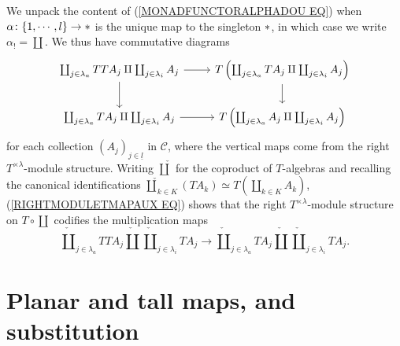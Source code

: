 \documentclass[a4paper,10pt]{article}%
\begin{document}
\begin{remark}\label{PRECOMPPOSTCOMP REM}
We unpack the content of (\ref{MONADFUNCTORALPHADOU EQ}) when 
$\alpha \colon \{1,\cdots,l\} \to \**$ is the unique map to the singleton $\**$, in which case we write $\alpha_{!} = \coprod$.
We thus have commutative diagrams
\begin{equation}\label{RIGHTMODULETMAPAUX EQ}
\begin{tikzcd}
	\coprod_{j \in \lambda_a} TT A_j \amalg \coprod_{j \in \lambda_i} A_j
	\ar{r} \ar{d} &
	T\left( \coprod_{j \in \lambda_a} T A_j \amalg \coprod_{j \in \lambda_i} A_j \right) \ar{d}
\\
	\coprod_{j \in \lambda_a} T A_j \amalg \coprod_{j \in \lambda_i} A_j
	\ar{r} &
		T\left( \coprod_{j \in \lambda_a} A_j \amalg \coprod_{j \in \lambda_i} A_j \right)
\end{tikzcd}
\end{equation}
for each collection $\left( A_j \right)_{j\in\underline{l}}$ in $\mathcal{C}$,
where the vertical maps
come from the right $T^{\times \lambda}$-module structure.
Writing $\mathbin{\check{\amalg}}$ for the coproduct of $T$-algebras and recalling the canonical identifications 
$\mathbin{\check{\coprod}}_{k \in K} (T A_k) \simeq T
\left( \coprod_{k \in K} A_k \right)$, 
(\ref{RIGHTMODULETMAPAUX EQ}) shows that the 
right $T^{\times \lambda}$-module structure on $T \circ \coprod$
codifies the multiplication maps
\[
\mathbin{\check{\coprod}}_{j \in \lambda_a} TT A_j 
	\mathbin{\check{\amalg}} 
\mathbin{\check{\coprod}}_{j \in \lambda_i} T A_j
	\to
\mathbin{\check{\coprod}}_{j \in \lambda_a} T A_j 
	\mathbin{\check{\amalg}}  
\mathbin{\check{\coprod}}_{j \in \lambda_i} T A_j.
\] 
\end{remark}






\section{Planar and tall maps, and substitution}\label{PLANAR_SECTION}

\end{document}
